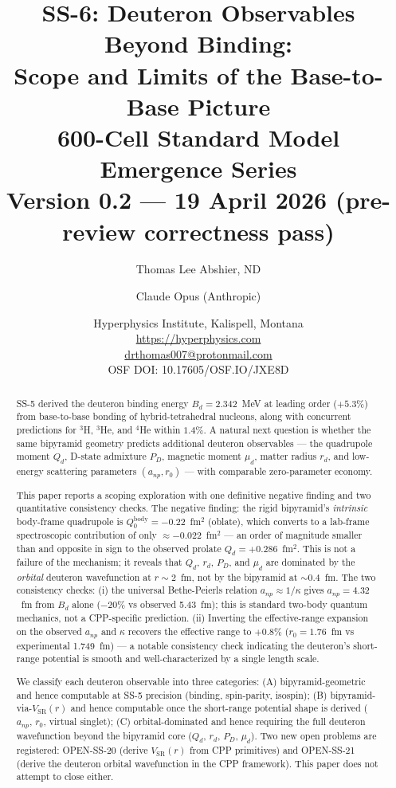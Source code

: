 \documentclass[11pt,letterpaper]{article}
\title{\textbf{SS-6: Deuteron Observables Beyond Binding:\\ Scope and Limits of the Base-to-Base Picture}\\[6pt]
{\large 600-Cell Standard Model Emergence Series}\\[4pt]
{\normalsize Version 0.2 --- 19 April 2026 (pre-review correctness pass)}}
\author{Thomas Lee Abshier, ND \and Claude Opus (Anthropic)}
\date{\normalsize Hyperphysics Institute, Kalispell, Montana\\
\url{https://hyperphysics.com}\\
\href{mailto:drthomas007@protonmail.com}{drthomas007@protonmail.com}\\[4pt]
\small OSF DOI: 10.17605/OSF.IO/JXE8D}
\newcommand{\Bd}{B_{d}}
\newcommand{\Qd}{Q_{d}}
\newcommand{\PD}{P_{D}}
\newcommand{\mud}{\mu_{d}}
\newcommand{\anp}{a_{np}}
\newcommand{\rzero}{r_{0}}
\newcommand{\VSR}{V_{\mathrm{SR}}}
\begin{document}
\maketitle

\begin{abstract}
SS-5 derived the deuteron binding energy $\Bd = 2.342$~MeV at leading order ($+5.3\%$) from base-to-base bonding of hybrid-tetrahedral nucleons, along with concurrent predictions for ${}^3$H, ${}^3$He, and ${}^4$He within $1.4\%$. A natural next question is whether the same bipyramid geometry predicts additional deuteron observables --- the quadrupole moment $\Qd$, D-state admixture $\PD$, magnetic moment $\mud$, matter radius $r_d$, and low-energy scattering parameters $(\anp, \rzero)$ --- with comparable zero-parameter economy.

This paper reports a scoping exploration with one definitive negative finding and two quantitative consistency checks. The negative finding: the rigid bipyramid's \emph{intrinsic} body-frame quadrupole is $Q_0^{\mathrm{body}} = -0.22$~fm$^2$ (oblate), which converts to a lab-frame spectroscopic contribution of only $\approx -0.022$~fm$^2$ --- an order of magnitude smaller than and opposite in sign to the observed prolate $\Qd = +0.286$~fm$^2$. This is not a failure of the mechanism; it reveals that $\Qd$, $r_d$, $\PD$, and $\mud$ are dominated by the \emph{orbital} deuteron wavefunction at $r \sim 2$~fm, not by the bipyramid at $\sim 0.4$~fm. The two consistency checks: (i) the universal Bethe-Peierls relation $\anp \approx 1/\kappa$ gives $\anp = 4.32$~fm from $\Bd$ alone ($-20\%$ vs observed 5.43~fm); this is standard two-body quantum mechanics, not a CPP-specific prediction. (ii) Inverting the effective-range expansion on the observed $\anp$ and $\kappa$ recovers the effective range to $+0.8\%$ ($\rzero = 1.76$~fm vs experimental 1.749~fm) --- a notable consistency check indicating the deuteron's short-range potential is smooth and well-characterized by a single length scale.

We classify each deuteron observable into three categories: (A) bipyramid-geometric and hence computable at SS-5 precision (binding, spin-parity, isospin); (B) bipyramid-via-$\VSR(r)$ and hence computable once the short-range potential shape is derived ($\anp$, $\rzero$, virtual singlet); (C) orbital-dominated and hence requiring the full deuteron wavefunction beyond the bipyramid core ($\Qd$, $r_d$, $\PD$, $\mud$). Two new open problems are registered: OPEN-SS-20 (derive $\VSR(r)$ from CPP primitives) and OPEN-SS-21 (derive the deuteron orbital wavefunction in the CPP framework). This paper does not attempt to close either.
\end{abstract}
\end{document}

